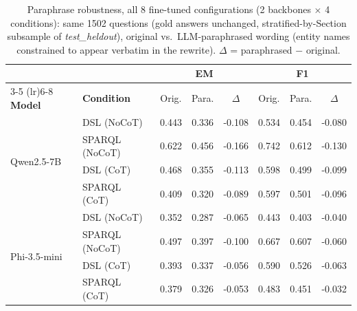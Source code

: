 \begin{table}[t]
\centering
\small
\begin{tabular}{l l ccc ccc}
\toprule
 & & \multicolumn{3}{c}{\textbf{EM}} & \multicolumn{3}{c}{\textbf{F1}} \\
\cmidrule(lr){3-5} \cmidrule(lr){6-8}
\textbf{Model} & \textbf{Condition} & Orig. & Para. & $\Delta$ & Orig. & Para. & $\Delta$ \\
\midrule
\multirow{4}{*}{Qwen2.5-7B} & DSL (NoCoT) & 0.443 & 0.336 & -0.108 & 0.534 & 0.454 & -0.080 \\
 & SPARQL (NoCoT) & 0.622 & 0.456 & -0.166 & 0.742 & 0.612 & -0.130 \\
 & DSL (CoT) & 0.468 & 0.355 & -0.113 & 0.598 & 0.499 & -0.099 \\
 & SPARQL (CoT) & 0.409 & 0.320 & -0.089 & 0.597 & 0.501 & -0.096 \\
\midrule
\multirow{4}{*}{Phi-3.5-mini} & DSL (NoCoT) & 0.352 & 0.287 & -0.065 & 0.443 & 0.403 & -0.040 \\
 & SPARQL (NoCoT) & 0.497 & 0.397 & -0.100 & 0.667 & 0.607 & -0.060 \\
 & DSL (CoT) & 0.393 & 0.337 & -0.056 & 0.590 & 0.526 & -0.063 \\
 & SPARQL (CoT) & 0.379 & 0.326 & -0.053 & 0.483 & 0.451 & -0.032 \\
\bottomrule
\end{tabular}
\caption{Paraphrase robustness, all 8 fine-tuned configurations (2 backbones $\times$ 4 conditions): same 1502 questions (gold answers unchanged, stratified-by-Section subsample of \emph{test\_heldout}), original vs.\ LLM-paraphrased wording (entity names constrained to appear verbatim in the rewrite). $\Delta$ = paraphrased $-$ original.}
\label{tab:paraphrase-robustness}
\end{table}

